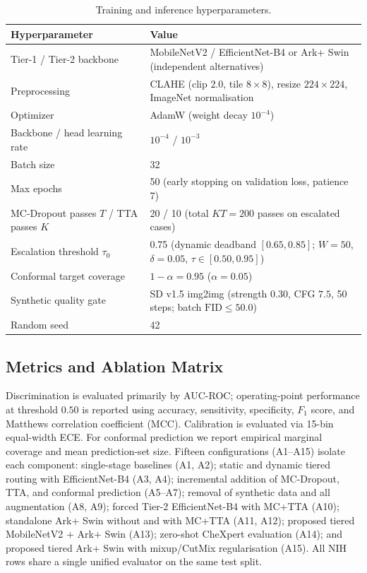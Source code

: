 \documentclass[diagnostics,article,submit,moreauthors]{Definitions/mdpi}
\newcommand{\rev}[1]{#1}
\begin{document}
\begin{table}[H]
\caption{Training and inference hyperparameters.}\label{tab:hyper}
\begin{tabular}{@{}ll@{}}
\toprule
Hyperparameter & Value\\
\midrule
Tier-1 / Tier-2 backbone & MobileNetV2 / \rev{EfficientNet-B4 or Ark+ Swin (independent alternatives)}\\
Preprocessing & \rev{CLAHE (clip $2.0$, tile $8\times 8$), resize $224\times 224$, ImageNet normalisation}\\
Optimizer & AdamW (weight decay $10^{-4}$)\\
Backbone / head learning rate & $10^{-4}$ / $10^{-3}$\\
Batch size & 32\\
Max epochs & 50 (early stopping on validation loss, patience 7)\\
MC-Dropout passes $T$ / TTA passes $K$ & 20 / 10 (total $KT=200$ passes on escalated cases)\\
Escalation threshold $\tau_0$ & 0.75 (dynamic deadband $[0.65,0.85]$; $W=50$, $\delta=0.05$, $\tau\in[0.50,0.95]$)\\
Conformal target coverage & $1-\alpha=0.95$ ($\alpha=0.05$)\\
Synthetic quality gate & \rev{SD v1.5 img2img (strength $0.30$, CFG $7.5$, 50 steps; batch $\mathrm{FID}\le 50.0$)}\\
Random seed & 42\\
\bottomrule
\end{tabular}
\end{table}

\subsection{Metrics and Ablation Matrix}

Discrimination is evaluated primarily by AUC-ROC; operating-point performance at threshold $0.50$ is reported using accuracy, sensitivity, specificity, $F_1$ score, and Matthews correlation coefficient (MCC). Calibration is evaluated via 15-bin equal-width ECE. For conformal prediction we report empirical marginal coverage and mean prediction-set size. Fifteen configurations (A1--A15) isolate each component: single-stage baselines (A1, A2); static and dynamic tiered routing with EfficientNet-B4 (A3, A4); incremental addition of MC-Dropout, TTA, and conformal prediction (A5--A7); removal of synthetic data and all augmentation (A8, A9); forced Tier-2 EfficientNet-B4 with MC+TTA (A10); standalone Ark+ Swin without and with MC+TTA (A11, A12); proposed tiered MobileNetV2 + Ark+ Swin (A13); zero-shot CheXpert evaluation (A14); and proposed tiered Ark+ Swin with mixup/CutMix regularisation (A15). All NIH rows share a single unified evaluator on the same test split.
\end{document}
